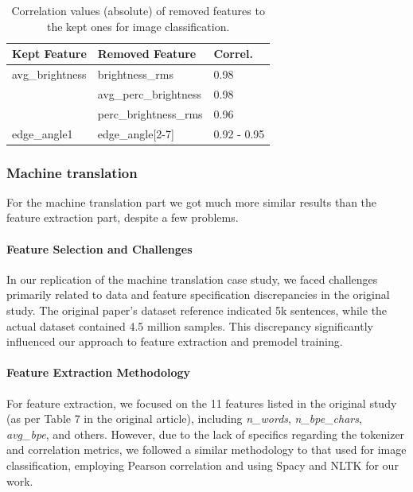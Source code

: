 \begin{table}[h]
	\centering
	\caption{Correlation values (absolute) of removed features to the kept ones for image classification.}
	\begin{tabular}{lll}
		\hline
		\textbf{Kept Feature} & \textbf{Removed Feature} & \textbf{Correl.} \\ \hline
		avg\_brightness       & brightness\_rms          & 0.98             \\
		                      & avg\_perc\_brightness    & 0.98             \\
		                      & perc\_brightness\_rms    & 0.96             \\
		edge\_angle1          & edge\_angle[2-7]         & 0.92 - 0.95      \\ \hline
	\end{tabular}
\end{table}



\subsubsection{Machine translation}
For the machine translation part we got much more similar results than the feature extraction part, despite a few problems.

\paragraph{Feature Selection and Challenges}
In our replication of the machine translation case study, we faced challenges primarily related to data and feature specification discrepancies in the original study. The original paper's dataset reference indicated 5k sentences, while the actual dataset contained 4.5 million samples. This discrepancy significantly influenced our approach to feature extraction and premodel training.

\paragraph{Feature Extraction Methodology}
For feature extraction, we focused on the 11 features listed in the original study (as per Table 7 in the original article), including \textit{n\_words}, \textit{n\_bpe\_chars}, \textit{avg\_bpe}, and others. However, due to the lack of specifics regarding the tokenizer and correlation metrics, we followed a similar methodology to that used for image classification, employing Pearson correlation and using Spacy and NLTK for our work.

